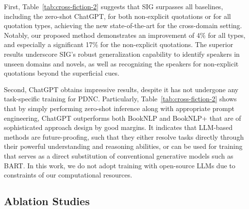 \documentclass[letterpaper]{article} %
\begin{document}
First, Table~\ref{tab:cross-fiction-2} suggests that SIG surpasses all baselines, including the zero-shot ChatGPT, for both non-explicit quotations or for all quotation types, achieving the new state-of-the-art for the cross-domain setting.  Notably, our proposed method demonstrates an improvement of 4\% for all types, and especially a significant 17\% for the non-explicit quotations.
The superior results underscore SIG's robust generalization capability to identify speakers in unseen domains and novels, as well as recognizing the speakers for non-explicit quotations beyond the superficial cues.

Second, ChatGPT obtains impressive results, despite it has not undergone any task-specific training for PDNC. Particularly, Table~\ref{tab:cross-fiction-2} shows that by simply performing zero-shot inference along with appropriate prompt engineering, ChatGPT outperforms both BookNLP and BookNLP+ that are of sophisticated approach design by good margins. It indicates that LLM-based methods are future-proofing, such that they either resolve tasks directly through their powerful understanding and reasoning abilities, or can be used for training that serves as a direct substitution of conventional generative models such as BART. In this work, we do not adopt training with open-source LLMs due to constraints of our computational resources.


\subsection{Ablation Studies}
\end{document}
